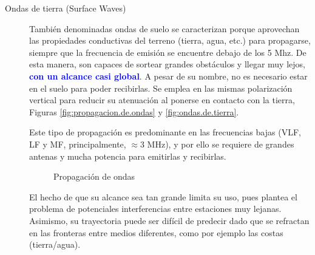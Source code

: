 \begin{description}
  \item[Ondas de tierra (Surface Waves)] Tambi\'en denominadas ondas de suelo se caracterizan porque aprovechan las propiedades conductivas del terreno (tierra, agua, etc.) para propagarse, siempre que la frecuencia de emisi\'on se encuentre debajo de los 5 Mhz. De esta manera, son capaces de sortear grandes obst\'aculos y llegar muy lejos, \textcolor{blue}{\bf con un alcance casi global}. A pesar de su nombre, no es necesario estar en el suelo para poder recibirlas.
Se emplea en las mismas polarizaci\'on vertical para reducir su atenuaci\'on al ponerse en contacto con la tierra, Figuras \ref{fig:propagacion.de.ondas} y \ref{fig:ondas.de.tierra}.

Este tipo de propagaci\'on es predominante en las frecuencias bajas (VLF, LF y MF, 
principalmente, $\approx 3$ MHz), y por ello se requiere de grandes antenas y mucha potencia 
para emitirlas y recibirlas.

\begin{figure}[!h]
  \centering
  \caption{Propagaci\'on de ondas}
\end{figure}

El hecho de que su alcance sea tan grande limita su uso, pues plantea el problema de potenciales interferencias entre estaciones muy lejanas. Asimismo, su trayectoria puede ser dif\'icil de predecir dado que se refractan en las fronteras entre medios diferentes, como por ejemplo las costas (tierra/agua). 


\end{description}
